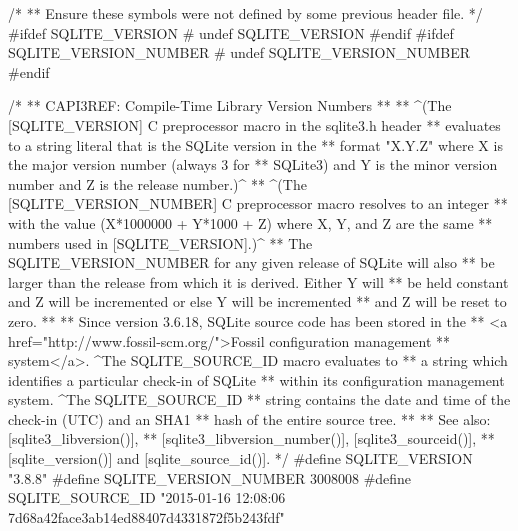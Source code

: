 \begin{Codex}[label=sqlite3.h,numbers=left]
{/*
** Ensure these symbols were not defined by some previous header file.
*/
#ifdef SQLITE_VERSION
# undef SQLITE_VERSION
#endif
#ifdef SQLITE_VERSION_NUMBER
# undef SQLITE_VERSION_NUMBER
#endif

/*
** CAPI3REF: Compile-Time Library Version Numbers
**
** ^(The [SQLITE_VERSION] C preprocessor macro in the sqlite3.h header
** evaluates to a string literal that is the SQLite version in the
** format "X.Y.Z" where X is the major version number (always 3 for
** SQLite3) and Y is the minor version number and Z is the release number.)^
** ^(The [SQLITE_VERSION_NUMBER] C preprocessor macro resolves to an integer
** with the value (X*1000000 + Y*1000 + Z) where X, Y, and Z are the same
** numbers used in [SQLITE_VERSION].)^
** The SQLITE_VERSION_NUMBER for any given release of SQLite will also
** be larger than the release from which it is derived.  Either Y will
** be held constant and Z will be incremented or else Y will be incremented
** and Z will be reset to zero.
**
** Since version 3.6.18, SQLite source code has been stored in the
** <a href="http://www.fossil-scm.org/">Fossil configuration management
** system</a>.  ^The SQLITE_SOURCE_ID macro evaluates to
** a string which identifies a particular check-in of SQLite
** within its configuration management system.  ^The SQLITE_SOURCE_ID
** string contains the date and time of the check-in (UTC) and an SHA1
** hash of the entire source tree.
**
** See also: [sqlite3_libversion()],
** [sqlite3_libversion_number()], [sqlite3_sourceid()],
** [sqlite_version()] and [sqlite_source_id()].
*/
#define SQLITE_VERSION        "3.8.8"
#define SQLITE_VERSION_NUMBER 3008008
#define SQLITE_SOURCE_ID      "2015-01-16 12:08:06 7d68a42face3ab14ed88407d4331872f5b243fdf"

}
\end{Codex}
